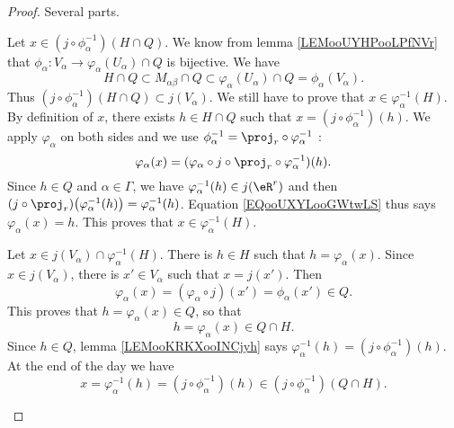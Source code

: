 \begin{proof}
	Several parts.
	\begin{subproof}
		Let \( x\in(j\circ\phi_{\alpha}^{-1})(H\cap Q)\). We know from lemma \ref{LEMooUYHPooLPfNVr} that \(\phi_{\alpha} \colon V_{\alpha}\to \varphi_{\alpha}(U_{\alpha})\cap Q  \) is bijective. We have
		\begin{equation}
			H\cap Q\subset M_{\alpha\beta}\cap Q\subset\varphi_{\alpha}(U_{\alpha})\cap Q=\phi_{\alpha}(V_{\alpha}).
		\end{equation}
		Thus \( (j\circ\phi_{\alpha}^{-1})(H\cap Q)\subset j(V_{\alpha})\). We still have to prove that \( x\in\varphi_{\alpha}^{-1}(H)\). By definition of \( x\), there exists \( h\in H\cap Q\) such that \( x=(j\circ\phi_{\alpha}^{-1})(h)\). We apply \( \varphi_{\alpha}\) on both sides and we use \( \phi_{\alpha}^{-1}=\proj_r\circ\varphi_{\alpha}^{-1}\) :
		\begin{equation}		\label{EQooUXYLooGWtwLS}
			\varphi_{\alpha}(x)=(\varphi_{\alpha}\circ j\circ\proj_r\circ\varphi_{\alpha}^{-1})(h).
		\end{equation}
		Since \( h\in Q\) and \( \alpha\in\Gamma\), we have \( \varphi_{\alpha}^{-1}(h)\in j(\eR^r)\) and then \( (j\circ\proj_r)\big( \varphi_{\alpha}^{-1}(h) \big)=\varphi_{\alpha}^{-1}(h)\). Equation \eqref{EQooUXYLooGWtwLS} thus says \( \varphi_{\alpha}(x)=h\). This proves that \( x\in\varphi_{\alpha}^{-1}(H)\).

		Let \( x\in j(V_{\alpha})\cap \varphi_{\alpha}^{-1}(H)\). There is \( h\in H\) such that \( h=\varphi_{\alpha}(x)\). Since \( x\in j(V_{\alpha})\), there is \( x'\in V_{\alpha}\) such that \( x=j(x')\). Then
		\begin{equation}
			\varphi_{\alpha}(x)=(\varphi_{\alpha}\circ j)(x')=\phi_{\alpha}(x')\in Q.
		\end{equation}
		This proves that \( h=\varphi_{\alpha}(x)\in Q\), so that
		\begin{equation}
			h=\varphi_{\alpha}(x)\in Q\cap H.
		\end{equation}
		Since \( h\in Q\), lemma \ref{LEMooKRKXooINCjyh} says \( \varphi_{\alpha}^{-1}(h)=(j\circ\phi_{\alpha}^{-1})(h)\). At the end of the day we have
		\begin{equation}
			x=\varphi_{\alpha}^{-1}(h)=(j\circ\phi_{\alpha}^{-1})(h)\in(j\circ\phi_{\alpha}^{-1})(Q\cap H).
		\end{equation}
	\end{subproof}
\end{proof}

